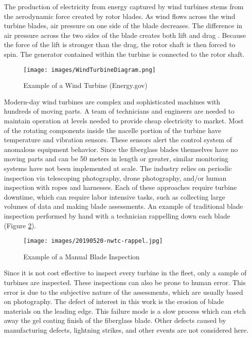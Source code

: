 \documentclass[runningheads]{llncs}
\begin{document}
The production of electricity from energy captured by wind turbines stems from the aerodynamic force created by rotor blades. As wind flows across the wind turbine blades, air pressure on one side of the blade decreases. The difference in air pressure across the two sides of the blade creates both lift and drag \cite{Turbines}. Because the force of the lift is stronger than the drag, the rotor shaft is then forced to spin. The generator contained within the turbine is connected to the rotor shaft. 

\begin{figure}[H]
    \centering
    \texttt{[image: images/WindTurbineDiagram.png]}
    \caption{Example of a Wind Turbine (Energy.gov)}
    \label{fig:WindTurbineDiagram}
\end{figure}

Modern-day wind turbines are complex and sophisticated machines with hundreds of moving parts. A team of technicians and engineers are needed to maintain operation at levels needed to provide cheap electricity to market. Most of the rotating components inside the nacelle portion of the turbine have temperature and vibration sensors. These sensors alert the control system of anomalous equipment behavior. Since the fiberglass blades themselves have no moving parts and can be 50 meters in length or greater, similar monitoring systems have not been implemented at scale. The industry relies on periodic inspection via telescoping photography, drone photography, and/or human inspection with ropes and harnesses. Each of these approaches require turbine downtime, which can require labor intensive tasks, such as collecting large volumes of data and making blade assessments. An example of traditional blade inspection performed by hand with a technician rappelling down each blade (Figure \ref{fig:manualInspect}).

\begin{figure}[H]
    \centering
    \texttt{[image: images/20190520-nwtc-rappel.jpg]}
    \caption{Example of a Manual Blade Inspection}
    \label{fig:manualInspect}
\end{figure}

Since it is not cost effective to inspect every turbine in the fleet, only a sample of turbines are inspected. These inspections can also be prone to human error. This error is due to the subjective nature of the assessments, which are usually based on photography. The defect of interest in this work is the erosion of blade materials on the leading edge. This failure mode is a slow process which can etch away the gel coating finish of the fiberglass blade. Other defects caused by manufacturing defects, lightning strikes, and other events are not considered here. 
\end{document}
